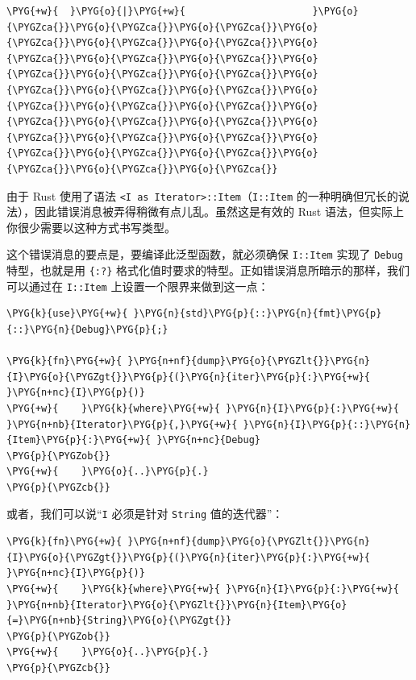 \begin{Verbatim}[commandchars=\\\{\},breaklines=true,breakanywhere=true,fontsize=\codefont,xleftmargin=17bp]
\PYG{+w}{  }\PYG{o}{|}\PYG{+w}{                      }\PYG{o}{\PYGZca{}}\PYG{o}{\PYGZca{}}\PYG{o}{\PYGZca{}}\PYG{o}{\PYGZca{}}\PYG{o}{\PYGZca{}}\PYG{o}{\PYGZca{}}\PYG{o}{\PYGZca{}}\PYG{o}{\PYGZca{}}\PYG{o}{\PYGZca{}}\PYG{o}{\PYGZca{}}\PYG{o}{\PYGZca{}}\PYG{o}{\PYGZca{}}\PYG{o}{\PYGZca{}}\PYG{o}{\PYGZca{}}\PYG{o}{\PYGZca{}}\PYG{o}{\PYGZca{}}\PYG{o}{\PYGZca{}}\PYG{o}{\PYGZca{}}\PYG{o}{\PYGZca{}}\PYG{o}{\PYGZca{}}\PYG{o}{\PYGZca{}}\PYG{o}{\PYGZca{}}\PYG{o}{\PYGZca{}}\PYG{o}{\PYGZca{}}\PYG{o}{\PYGZca{}}\PYG{o}{\PYGZca{}}\PYG{o}{\PYGZca{}}\PYG{o}{\PYGZca{}}\PYG{o}{\PYGZca{}}\PYG{o}{\PYGZca{}}
\end{Verbatim}

由于 Rust 使用了语法 \texttt{<I as Iterator>::Item}（\texttt{I::Item} 的一种明确但冗长的说法），因此错误消息被弄得稍微有点儿乱。虽然这是有效的 Rust 语法，但实际上你很少需要以这种方式书写类型。

这个错误消息的要点是，要编译此泛型函数，就必须确保 \texttt{I::Item} 实现了 \texttt{Debug} 特型，也就是用 \texttt{\{:?\}} 格式化值时要求的特型。正如错误消息所暗示的那样，我们可以通过在 \texttt{I::Item} 上设置一个限界来做到这一点：

\begin{Verbatim}[commandchars=\\\{\},breaklines=true,breakanywhere=true,fontsize=\codefont,xleftmargin=17bp]
\PYG{k}{use}\PYG{+w}{ }\PYG{n}{std}\PYG{p}{::}\PYG{n}{fmt}\PYG{p}{::}\PYG{n}{Debug}\PYG{p}{;}

\PYG{k}{fn}\PYG{+w}{ }\PYG{n+nf}{dump}\PYG{o}{\PYGZlt{}}\PYG{n}{I}\PYG{o}{\PYGZgt{}}\PYG{p}{(}\PYG{n}{iter}\PYG{p}{:}\PYG{+w}{ }\PYG{n+nc}{I}\PYG{p}{)}
\PYG{+w}{    }\PYG{k}{where}\PYG{+w}{ }\PYG{n}{I}\PYG{p}{:}\PYG{+w}{ }\PYG{n+nb}{Iterator}\PYG{p}{,}\PYG{+w}{ }\PYG{n}{I}\PYG{p}{::}\PYG{n}{Item}\PYG{p}{:}\PYG{+w}{ }\PYG{n+nc}{Debug}
\PYG{p}{\PYGZob{}}
\PYG{+w}{    }\PYG{o}{..}\PYG{p}{.}
\PYG{p}{\PYGZcb{}}
\end{Verbatim}

或者，我们可以说“\texttt{I} 必须是针对 \texttt{String} 值的迭代器”：

\begin{Verbatim}[commandchars=\\\{\},breaklines=true,breakanywhere=true,fontsize=\codefont,xleftmargin=17bp]
\PYG{k}{fn}\PYG{+w}{ }\PYG{n+nf}{dump}\PYG{o}{\PYGZlt{}}\PYG{n}{I}\PYG{o}{\PYGZgt{}}\PYG{p}{(}\PYG{n}{iter}\PYG{p}{:}\PYG{+w}{ }\PYG{n+nc}{I}\PYG{p}{)}
\PYG{+w}{    }\PYG{k}{where}\PYG{+w}{ }\PYG{n}{I}\PYG{p}{:}\PYG{+w}{ }\PYG{n+nb}{Iterator}\PYG{o}{\PYGZlt{}}\PYG{n}{Item}\PYG{o}{=}\PYG{n+nb}{String}\PYG{o}{\PYGZgt{}}
\PYG{p}{\PYGZob{}}
\PYG{+w}{    }\PYG{o}{..}\PYG{p}{.}
\PYG{p}{\PYGZcb{}}
\end{Verbatim}

